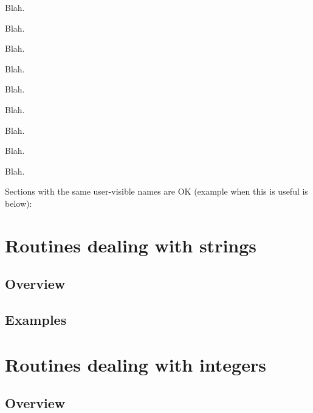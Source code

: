 \documentclass{report}
\newif\ifpdf
\begin{document}
Blah.

Blah.

Blah.

Blah.

Blah.

Blah.

Blah.

Blah.

Blah.

Sections with the same user{-}visible names are OK (example when this is useful is below):

\label{SecStrings}
\section{Routines dealing with strings}


\label{SecStringsOverview}
\ifpdf
\subsection*{\large{\textbf{Overview}}\normalsize\hspace{1ex}\hrulefill}\else
\subsection*{Overview}
\fi


\label{SecStringsExamples}
\ifpdf
\subsection*{\large{\textbf{Examples}}\normalsize\hspace{1ex}\hrulefill}\else
\subsection*{Examples}
\fi


\label{SecIntegers}
\section{Routines dealing with integers}


\label{SecIntegersOverview}
\ifpdf
\subsection*{\large{\textbf{Overview}}\normalsize\hspace{1ex}\hrulefill}\else
\subsection*{Overview}
\fi
\end{document}

